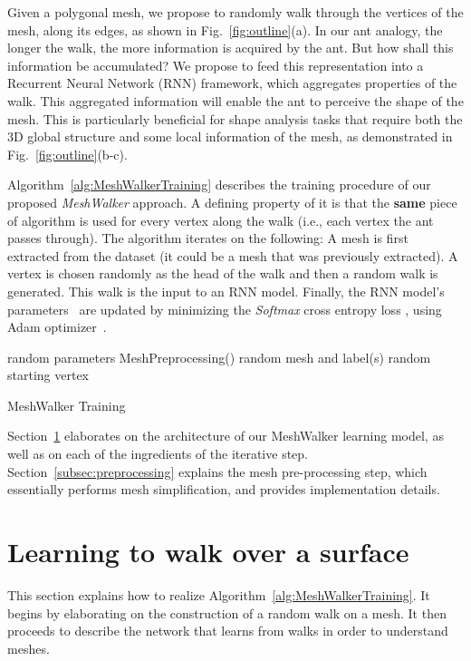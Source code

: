 \documentclass[acmtog]{acmart}
\begin{document}
Given a polygonal mesh, we propose to randomly walk through the vertices of the mesh, along its edges,
as shown in Fig.~\ref{fig:outline}(a).
In our ant analogy, the longer the walk, the more information is acquired by the ant.
But how shall this information be accumulated?
We propose to feed this representation into a Recurrent Neural Network (RNN) framework, which aggregates properties of the walk.
This aggregated information will enable the ant to perceive the shape of the mesh.
This is particularly beneficial for shape analysis tasks that require both the 3D global structure and some local information of the mesh, as demonstrated in Fig.~\ref{fig:outline}(b-c).

Algorithm~\ref{alg:MeshWalkerTraining} describes the training procedure of our proposed {\em MeshWalker} approach. 
A defining property of it is that the \textbf{same} piece of algorithm is used for every vertex along the walk (i.e., each vertex the ant passes through).
The algorithm  iterates on the following:
A mesh is first extracted from the dataset (it could be a mesh that was previously extracted).
A vertex is chosen randomly as the head of the walk and then a random walk is generated.
This walk is the input to an RNN model.
Finally, the RNN model's parameters~ are updated by minimizing the {\em Softmax} cross entropy loss , using Adam optimizer~\cite{kingma2014adam}. 

\begin{algorithm}[t]
\SetAlgoNoLine
{}
 random parameters\;
 MeshPreprocessing()\;
    {
         random mesh  and label(s) \;
         random starting vertex\;
        \;
        \;
\;
    }
\caption{MeshWalker Training}
\label{alg:MeshWalkerTraining}
\end{algorithm}


Section~\ref{sec:model} elaborates on the architecture of our MeshWalker learning model, as well as on each of the  ingredients of the iterative step.
Section~\ref{subsec:preprocessing} explains the mesh pre-processing step, which essentially performs mesh simplification, and provides implementation details.

\section{Learning to walk over a surface}
\label{sec:model}
This section explains how to realize Algorithm~\ref{alg:MeshWalkerTraining}.
It begins by elaborating on the construction of a random walk on a mesh.
It then proceeds to describe the network that learns from walks in order to understand meshes.
\end{document}
